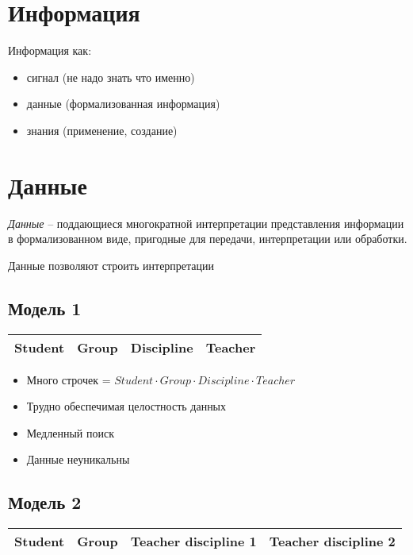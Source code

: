 \documentclass[12pt, a4paper]{article}
\begin{document}
\section{Информация}
Информация как:
\begin{itemize}
    \item сигнал (не надо знать что именно)
    \item данные (формализованная информация)
    \item знания (применение, создание)
\end{itemize}

\section{Данные}
\emph{Данные} -- поддающиеся многократной интерпретации представления информации в формализованном виде,  пригодные для передачи, интерпретации или обработки.

Данные позволяют строить интерпретации

\subsection{Модель 1}
\begin{center}
    \begin{tabular}{| c | c | c | c |}
        \hline
        Student & Group & Discipline & Teacher \\
        \hline
    \end{tabular}
\end{center}

\begin{itemize}
    \item Много строчек = $Student \cdot Group \cdot Discipline \cdot Teacher$
    \item Трудно обеспечимая целостность данных
    \item Медленный поиск
    \item Данные неуникальны
\end{itemize}

\subsection{Модель 2}
\begin{center}
	\begin{tabular}{| c | c | c | c |}
    	\hline
        Student & Group & Teacher discipline 1 & Teacher discipline 2 \\
        \hline
    \end {tabular}
\end{center}
\end{document}
